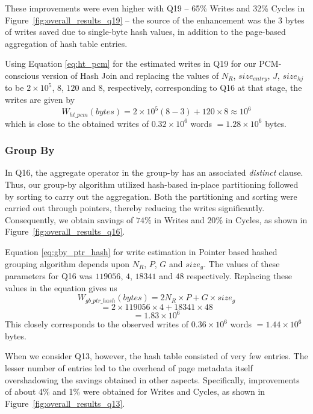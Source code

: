 These improvements were even higher
with Q19  -- 65\% Writes and 32\% Cycles in Figure~\ref{fig:overall_results_q19} -- the source of the enhancement
was the 3 bytes of writes saved due to single-byte hash values,
in addition to the page-based aggregation of hash table entries.

Using Equation \ref{eq:ht_pcm} for the estimated writes in Q19 for our PCM-conscious version of Hash Join and replacing the values of $N_R$, $size_{entry}$, $J$, $size_{hj}$ to be $2 \times 10^5$, $8$, $120$ and $8$, respectively, corresponding to Q16 at that stage, the writes are given by $$W_{ht\_pcm}(bytes) = 2 \times 10^5 (8-3) + 120 \times 8 \approx 10^6$$ which is close to the obtained writes of $0.32 \times 10^6$ words $= 1.28 \times 10^6$ bytes.
\subsubsection{Group By}

In Q16, the aggregate operator in the group-by has
an associated \textit{distinct} clause.  Thus, our group-by algorithm
utilized hash-based in-place partitioning followed by sorting to carry
out the aggregation. Both the partitioning and sorting were carried out
through pointers, thereby reducing the writes significantly. Consequently,
we obtain savings of $74\%$ in Writes and $20\%$ in Cycles, as shown in
Figure~\ref{fig:overall_results_q16}.

Equation \ref{eq:gby_ptr_hash} for write estimation in Pointer based hashed grouping algorithm depends upon $N_R$, $P$, $G$ and $size_g$. The values of these parameters for Q16 was $119056$, $4$, $18341$ and $48$ respectively. Replacing these values in the equation gives us 
$$W_{gb\_ptr\_hash}(bytes) = 2N_R \times P + G \times size_g$$
$$= 2 \times 119056\times 4 + 18341 \times 48$$ 
$$ = 1.83 \times 10^6$$ This closely corresponds to the observed writes of $0.36 \times 10^6$ words $= 1.44 \times 10^6$ bytes. 

When we consider Q13, however, the hash table consisted of very few entries. The lesser number of entries led to the overhead of page metadata itself overshadowing the savings obtained in other aspects. Specifically, improvements of
about 4\% and 1\% were obtained for Writes and Cycles, as shown in
Figure~\ref{fig:overall_results_q13}.

\begin{comment}

The data at this stage of the group-by was about 6 MB. Using the
bounds derived in Equations \ref{eq:gby_conv_sort} and \ref{eq:gby_ptr_hybrid}, the write ratios of the native and
PCM-conscious algorithms would be within $\frac{ \frac{2 \times size_{ptr}}{N_R
L_R} + 1}{2+ln\frac{N_R L_R}{|DRAM|} + 1} = \frac{1}{3+ln\frac {6M}{4M}
} \approx 29\%$, which is in accordance with the empirical savings of 74\%.

\end{comment}

